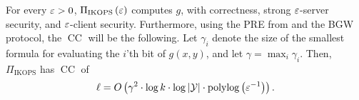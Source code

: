 \documentclass{llncs}
\newcommand{\sOT}[3]{\binom{#2}{#1}\text{-}#3\text{-string-OT}}
\newcommand{\Y}{\mathcal{Y}}
\newcommand{\CC}{\operatorname{CC}}
\newcommand{\IKOPS}{\operatorname{IKOPS}}
\begin{document}
\begin{theorem}
	For every $\varepsilon>0$, $\Pi_{\IKOPS}\of{\eps}$ computes $g$, with correctness, strong $\varepsilon$-server security, and $\varepsilon$-client security. Furthermore, using the PRE from \cite{IK02,AIK04} and the BGW protocol, the $\CC$ will be the following. Let $\gamma_i$ denote the size of the smallest formula for evaluating the $i$'th bit of $g(x,y)$, and let $\gamma=\max_{i} \gamma_i$.	Then, $\Pi_{\IKOPS}$ has $\CC$ of \changed{$\ell=\log\of{k}\cdot\tilde{O}\of{\log\of{|\Y|}\cdot\left(\log\of{{\eps^{-1}}}+\alpha\right)^2}+\polylog(\eps^{-1})$.}
    $$\ell=O\of{\gamma^2\cdot\log k\cdot\log|\Y|\cdot\polylog\of{\eps^{-1}}}.$$
\end{theorem}



\end{document}
